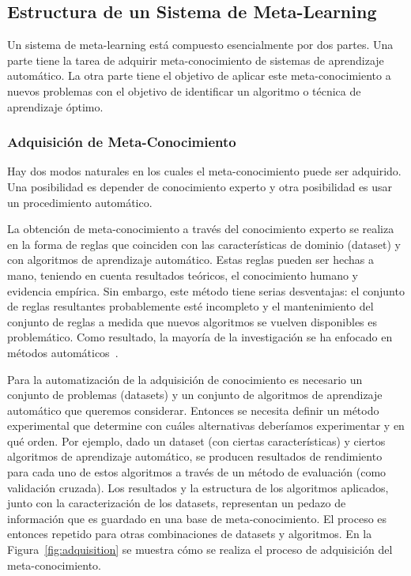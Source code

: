 \subsection{Estructura de un Sistema de Meta-Learning}

Un sistema de meta-learning está compuesto esencialmente por dos partes. Una parte tiene la tarea de adquirir meta-conocimiento de sistemas de aprendizaje automático. La otra parte tiene el objetivo de aplicar este meta-conocimiento a nuevos problemas con el objetivo de identificar un algoritmo o técnica de aprendizaje óptimo.

\subsubsection{Adquisición de Meta-Conocimiento} 

Hay dos modos naturales en los cuales el meta-conocimiento puede ser adquirido. Una posibilidad es depender de conocimiento experto y otra posibilidad es usar un procedimiento automático. 

La obtención de meta-conocimiento a través del conocimiento experto se realiza en la forma de reglas que coinciden con las características de dominio (dataset) y con algoritmos de aprendizaje automático. Estas reglas pueden ser hechas a mano, teniendo en cuenta resultados teóricos, el conocimiento humano y evidencia empírica. Sin embargo, este método tiene serias desventajas: el conjunto de reglas resultantes probablemente esté incompleto y el mantenimiento del conjunto de reglas a medida que nuevos algoritmos se vuelven disponibles es problemático. Como resultado, la mayoría de la investigación se ha enfocado en métodos automáticos~\cite{bradzil2017metalearning}.
	
Para la automatización de la adquisición de conocimiento es necesario un conjunto de problemas (datasets) y un conjunto de algoritmos de aprendizaje automático que queremos considerar. Entonces se necesita definir un método experimental que determine con cuáles alternativas deberíamos experimentar y en qué orden. Por ejemplo, dado un dataset (con ciertas características) y ciertos algoritmos de aprendizaje automático, se producen resultados de rendimiento para cada uno de estos algoritmos a través de un método de evaluación (como validación cruzada). Los resultados y la estructura de los algoritmos aplicados, junto con la caracterización de los datasets, representan un pedazo de información que es guardado en una base de meta-conocimiento. El proceso es entonces repetido para otras combinaciones de datasets y algoritmos. 
En la Figura~\ref{fig:adquisition} se muestra cómo se realiza el proceso de adquisición del meta-conocimiento. %

